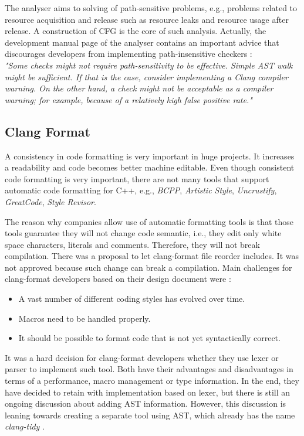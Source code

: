 The analyser aims to solving of path-sensitive problems, e.g., problems related to resource acquisition and release such as resource leaks and resource usage after release. A construction of CFG is the core of such analysis. Actually, the development manual page of the analyser contains an important advice that discourages developers from implementing path-insensitive checkers \cite{clang-analyzer-manual}:\\

\label{clang-analyzer-checkers}
\emph{"Some checks might not require path-sensitivity to be effective. Simple AST walk might be sufficient. If that is the case, consider implementing a Clang compiler warning. On the other hand, a check might not be acceptable as a compiler warning; for example, because of a relatively high false positive rate."}

\subsection{Clang Format}
\label{clang-format}
A consistency in code formatting is very important in huge projects. It increases a readability and code becomes better machine editable. Even though consistent code formatting is very important, there are not many tools that support automatic code formatting for C++, e.g., \emph{BCPP}, \emph{Artistic Style}, \emph{Uncrustify}, \emph{GreatCode}, \emph{Style Revisor}.

The reason why companies allow use of automatic formatting tools is that those tools guarantee they will not change code semantic, i.e., they edit only white space characters, literals and comments. Therefore, they will not break compilation. There was a proposal to let clang-format file reorder includes. It was not approved because such change can break a compilation. Main challenges for clang-format developers based on their design document were \cite{clang-format-design}:

\begin{itemize}
\item A vast number of different coding styles has evolved over time.
\item Macros need to be handled properly.
\item It should be possible to format code that is not yet syntactically correct.
\end{itemize}

It was a hard decision for clang-format developers whether they use lexer or parser to implement such tool. Both have their advantages and disadvantages in terms of a performance, macro management or type information. In the end, they have decided to retain with implementation based on lexer, but there is still an ongoing discussion about adding AST information. However, this discussion is leaning towards creating a separate tool using AST, which already has the name \emph{clang-tidy} \cite{clang-tidy}.

